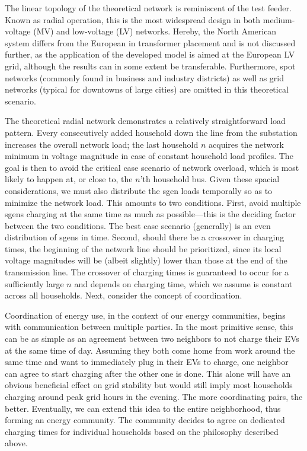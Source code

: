 \documentclass[a4paper,10pt]{report}
\begin{document}
The linear topology of the theoretical network is reminiscent of the test feeder. Known as radial operation, this is the most widespread design in both medium-voltage (MV) and low-voltage (LV) networks. Hereby, the North American system differs from the European in transformer placement and is not discussed further, as the application of the developed model is aimed at the European LV grid, although the results can in some extent be transferable. Furthermore, spot networks (commonly found in business and industry districts) as well as grid networks (typical for downtowns of large cities) are omitted in this theoretical scenario.

The theoretical radial network demonstrates a relatively straightforward load pattern. Every consecutively added household down the line from the substation increases the overall network load; the last household $n$ acquires the network minimum in voltage magnitude in case of constant household load profiles. The goal is then to avoid the critical case scenario of network overload, which is most likely to happen at, or close to, the $n$'th household bus. Given these spacial considerations, we must also distribute the sgen loads temporally so as to minimize the network load. This amounts to two conditions. First, avoid multiple sgens charging at the same time as much as possible---this is the deciding factor between the two conditions. The best case scenario (generally) is an even distribution of sgens in time. Second, should there be a crossover in charging times, the beginning of the network line should be prioritized, since its local voltage magnitudes will be (albeit slightly) lower than those at the end of the transmission line. The crossover of charging times is guaranteed to occur for a sufficiently large $n$ and depends on charging time, which we assume is constant across all households. Next, consider the concept of coordination.

Coordination of energy use, in the context of our energy communities, begins with communication between multiple parties. In the most primitive sense, this can be as simple as an agreement between two neighbors to not charge their EVs at the same time of day. Assuming they both come home from work around the same time and want to immediately plug in their EVs to charge, one neighbor can agree to start charging after the other one is done. This alone will have an obvious beneficial effect on grid stability but would still imply most households charging around peak grid hours in the evening. The more coordinating pairs, the better. Eventually, we can extend this idea to the entire neighborhood, thus forming an energy community. The community decides to agree on dedicated charging times for individual households based on the philosophy described above.
\end{document}
